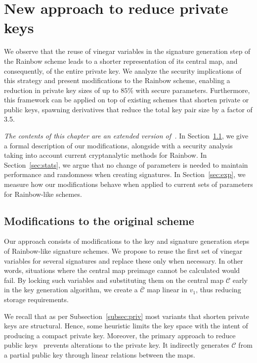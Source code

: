 \documentclass[12pt, a4paper, oneside]{memoir}
\theoremstyle{definition}
\begin{document}
\chapter{New approach to reduce private keys}\label{ch:eta}

We observe that the reuse of vinegar variables in the signature generation step of the Rainbow scheme leads to a shorter representation of its central map, and consequently, of the entire private key. We analyze the security implications of this strategy and present modifications to the Rainbow scheme, enabling a reduction in private key sizes of up to $85\%$ with secure parameters. Furthermore, this framework can be applied on top of existing schemes that shorten private or public keys, spawning derivatives that reduce the total key pair size by a factor of 3.5.

\emph{The contents of this chapter are an extended version of~\cite{Zambonin:201907}.} In Section~\ref{sec:mod}, we give a formal description of our modifications, alongside with a security analysis taking into account current cryptanalytic methods for Rainbow. In Section~\ref{sec:stats}, we argue that no change of parameters is needed to maintain performance and randomness when creating signatures. In Section~\ref{sec:exp}, we measure how our modifications behave when applied to current sets of parameters for Rainbow-like schemes.

\section{Modifications to the original scheme}\label{sec:mod}

Our approach consists of modifications to the key and signature generation steps of Rainbow-like signature schemes. We propose to reuse the first set of vinegar variables for several signatures and replace these only when necessary. In other words, situations where the central map preimage cannot be calculated would fail. By locking such variables and substituting them on the central map $\mathcal{C}$ early in the key generation algorithm, we create a $\overline{\mathcal{C}}$ map linear in $v_{1}$, thus reducing storage requirements.

We recall that as per Subsection~\ref{subsec:priv} most variants that shorten private keys are structural. Hence, some heuristic limits the key space with the intent of producing a compact private key. Moreover, the primary approach to reduce public keys~\cite{Petzoldt:201307} prevents alterations to the private key. It indirectly generates $\mathcal{C}$ from a partial public key through linear relations between the maps.
\end{document}
